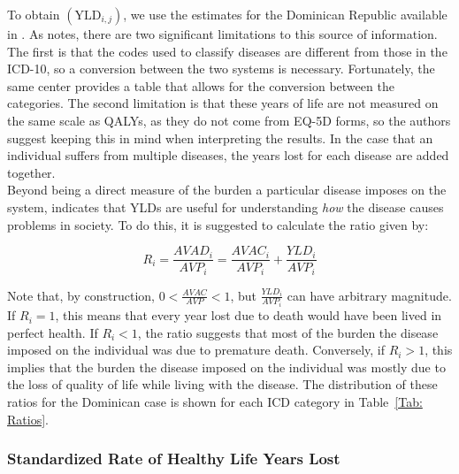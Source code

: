 \documentclass[11pt]{article}
\numberwithin{equation}{section}
\theoremstyle{remark}
\begin{document}
To obtain $(\text{YLD}_{i,j})$, we use the estimates for the Dominican Republic available in \citet{GBDC2019}. As \citet{Claxton2015} notes, there are two significant limitations to this source of information. The first is that the codes used to classify diseases are different from those in the ICD-10, so a conversion between the two systems is necessary. Fortunately, the same center provides a table that allows for the conversion between the categories. The second limitation is that these years of life are not measured on the same scale as QALYs, as they do not come from EQ-5D forms, so the authors suggest keeping this in mind when interpreting the results. In the case that an individual suffers from multiple diseases, the years lost for each disease are added together. \\

Beyond being a direct measure of the burden a particular disease imposes on the system, \citet{Claxton2015} indicates that YLDs are useful for understanding \emph{how} the disease causes problems in society. To do this, it is suggested to calculate the ratio given by:

\[R_i=\dfrac{AVAD_i}{AVP_i}=\dfrac{AVAC_i}{AVP_i}+\dfrac{YLD_i}{AVP_i}\]

Note that, by construction, $0<\frac{AVAC}{AVP}<1$, but $\frac{YLD_i}{AVP_i}$ can have arbitrary magnitude. If $R_i=1$, this means that every year lost due to death would have been lived in perfect health. If $R_i<1$, the ratio suggests that most of the burden the disease imposed on the individual was due to premature death. Conversely, if $R_i>1$, this implies that the burden the disease imposed on the individual was mostly due to the loss of quality of life while living with the disease. The distribution of these ratios for the Dominican case is shown for each ICD category in Table~\ref{Tab: Ratios}.
\begin{table}[H]
    \caption{\label{Tab: Ratios} Disease burden ratios by disease type, 2016--2019}
    \centering
    \scalebox{0.8}{
    \setlength{\extrarowheight}{1pt}
    \begin{threeparttable}
     
    \end{threeparttable}
    }
\end{table}

\subsubsection{Standardized Rate of Healthy Life Years Lost}
\end{document}
